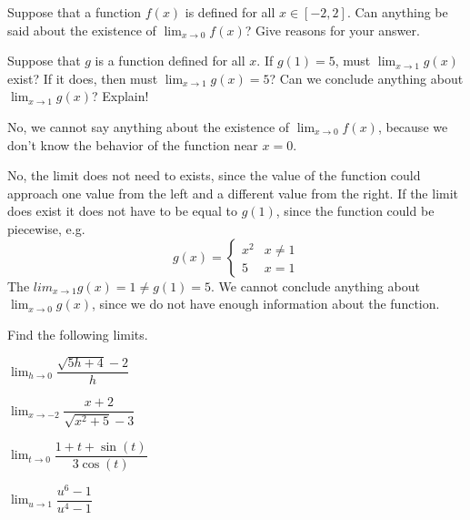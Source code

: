 \documentclass{hwset}
\begin{document}
\begin{problem}[2.]
	\be
		\item Suppose that a function $f(x)$ is defined for all $x\in[-2,2]$. Can
		anything be said about the existence of $\lim_{x\to 0}f(x)$? Give reasons
		for your answer.
		\item Suppose that $g$ is a function defined for all $x$. If $g(1)=5$, must
		$\lim_{x\to1}g(x)$ exist? If it does, then must $ \lim_{x\to1}g(x)=5$? Can
		we conclude anything about $\lim_{x\to1}g(x)$? Explain!
	\ee
\end{problem}

\be
	\item \begin{solution}
		No, we cannot say anything about the existence of $\lim_{x \to 0} f(x)$,
		because we don't know the behavior of the function near $x=0$.
	\end{solution}
	\item \begin{solution}
		No, the limit does not need to exists, since the value of the function could
		approach one value from the left and a different value from the right. If
		the limit does exist it does not have to be equal to $g(1)$, since the
		function could be piecewise, e.g.
		\begin{equation*}
			g(x) = \begin{cases}
				x^2 & x \ne 1 \\
				5 & x = 1
			\end{cases}
		\end{equation*}
		The $lim_{x \to 1} g(x) = 1 \ne g(1) = 5$. We cannot conclude anything about
		$\lim_{x\to 0} g(x)$, since we do not have enough information about the
		function.
	\end{solution}
\ee

\begin{problem}[3.] Find the following limits.
	\be
		\item $\lim_{h\to 0}\dfrac{\sqrt{5h+4}-2}{h}$
		\item $\lim_{x\to -2}\dfrac{x+2}{\sqrt{x^2+5}-3}$
		\item $\lim_{t\to 0}\dfrac{1+t+\sin(t)}{3\cos(t)}$
		\item $\lim_{u\to 1}\dfrac{u^{6}-1}{u^{4}-1}$
	\ee
\end{problem}
\end{document}
